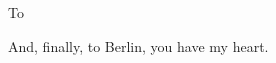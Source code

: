 \begin{acknowledgements}
\par To 

\par And, finally, to Berlin, you have my heart.




%





\end{acknowledgements}
